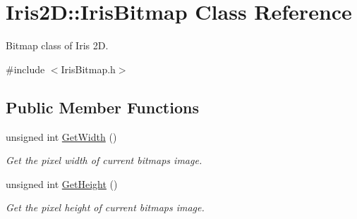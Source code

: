 \hypertarget{class_iris2_d_1_1_iris_bitmap}{}\section{Iris2D\+:\+:Iris\+Bitmap Class Reference}
\label{class_iris2_d_1_1_iris_bitmap}


Bitmap class of Iris 2D.  




{\ttfamily \#include $<$Iris\+Bitmap.\+h$>$}

\subsection*{Public Member Functions}
\begin{DoxyCompactItemize}
\item 
unsigned int \hyperlink{class_iris2_d_1_1_iris_bitmap_a5bf259139daf86b07d8f0ff8dad44302}{Get\+Width} ()
\begin{DoxyCompactList}\small\item\em Get the pixel width of current bitmap\textquotesingle{}s image. \end{DoxyCompactList}\item 
unsigned int \hyperlink{class_iris2_d_1_1_iris_bitmap_ad97028fda44cce4622d8ab78d8ba16b9}{Get\+Height} ()
\begin{DoxyCompactList}\small\item\em Get the pixel height of current bitmap\textquotesingle{}s image. \end{DoxyCompactList}\end{DoxyCompactItemize}
